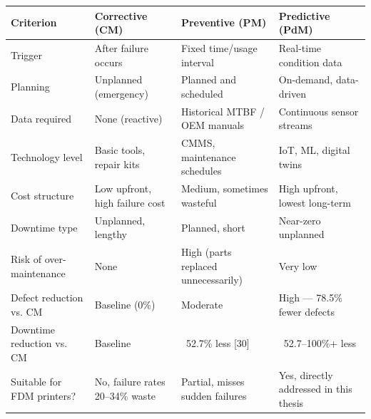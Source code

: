 \begin{tabular}{|L{3.2cm}|C{3.0cm}|C{3.0cm}|C{3.0cm}|}
	\hline
	\textbf{Criterion} & \textbf{Corrective (CM)} & \textbf{Preventive (PM)} & \textbf{Predictive (PdM)} \\
	\hline
	Trigger & After failure occurs & Fixed time/usage interval & Real-time condition data \\
	\hline
	Planning & Unplanned (emergency) & Planned and scheduled & On-demand, data-driven \\
	\hline
	Data required & None (reactive) & Historical MTBF / OEM manuals & Continuous sensor streams \\
	\hline
	Technology level & Basic tools, repair kits & CMMS, maintenance schedules & IoT, ML, digital twins \\
	\hline
	Cost structure & Low upfront, high failure cost & Medium, sometimes wasteful & High upfront, lowest long-term \\
	\hline
	Downtime type & Unplanned, lengthy & Planned, short & Near-zero unplanned \\
	\hline
	Risk of over-maintenance & None & High (parts replaced unnecessarily) & Very low \\
	\hline
	Defect reduction vs. CM & Baseline (0\%) & Moderate & High — 78.5\% fewer defects \\
	\hline
	Downtime reduction vs. CM & Baseline & ~52.7\% less [30] & ~52.7–100\%+ less \\
	\hline
	Suitable for FDM printers? & No, failure rates 20–34\% waste & Partial, misses sudden failures & Yes, directly addressed in this thesis \\
	\hline
\end{tabular}